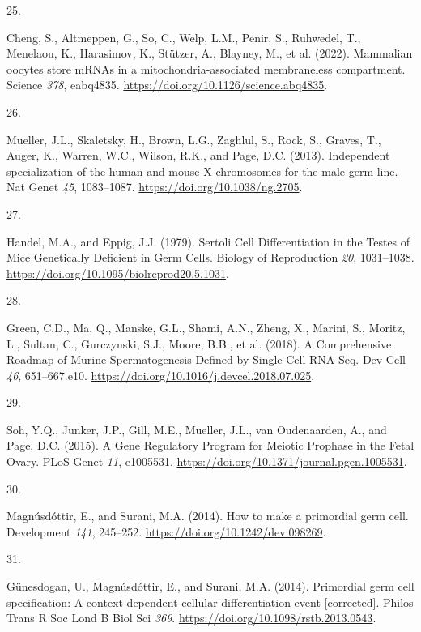 \documentclass[
]{article}
\newlength{\cslhangindent}
\newlength{\csllabelwidth}
\newlength{\cslentryspacingunit} %
\newenvironment{CSLReferences}[2] %
 {%
  \setlength{\parindent}{0pt}
  \ifodd #1
  \let\oldpar\par
  \def\par{\hangindent=\cslhangindent\oldpar}
  \fi
  \setlength{\parskip}{#2\cslentryspacingunit}
 }%
 {}
\newcommand{\CSLLeftMargin}[1]{\parbox[t]{\csllabelwidth}{#1}}
\newcommand{\CSLRightInline}[1]{\parbox[t]{\linewidth - \csllabelwidth}{#1}\break}
\begin{document}
\begin{CSLReferences}{0}{0}
\leavevmode{}%
\CSLLeftMargin{25. }%
\CSLRightInline{Cheng, S., Altmeppen, G., So, C., Welp, L.M., Penir, S.,
Ruhwedel, T., Menelaou, K., Harasimov, K., Stützer, A., Blayney, M., et
al. (2022). Mammalian oocytes store {mRNAs} in a mitochondria-associated
membraneless compartment. Science \emph{378}, eabq4835.
\url{https://doi.org/10.1126/science.abq4835}.}

\leavevmode{}%
\CSLLeftMargin{26. }%
\CSLRightInline{Mueller, J.L., Skaletsky, H., Brown, L.G., Zaghlul, S.,
Rock, S., Graves, T., Auger, K., Warren, W.C., Wilson, R.K., and Page,
D.C. (2013). Independent specialization of the human and mouse {X}
chromosomes for the male germ line. Nat Genet \emph{45}, 1083--1087.
\url{https://doi.org/10.1038/ng.2705}.}

\leavevmode{}%
\CSLLeftMargin{27. }%
\CSLRightInline{Handel, M.A., and Eppig, J.J. (1979). Sertoli {Cell
Differentiation} in the {Testes} of {Mice Genetically Deficient} in
{Germ Cells}. Biology of Reproduction \emph{20}, 1031--1038.
\url{https://doi.org/10.1095/biolreprod20.5.1031}.}

\leavevmode{}%
\CSLLeftMargin{28. }%
\CSLRightInline{Green, C.D., Ma, Q., Manske, G.L., Shami, A.N., Zheng,
X., Marini, S., Moritz, L., Sultan, C., Gurczynski, S.J., Moore, B.B.,
et al. (2018). A {Comprehensive Roadmap} of {Murine Spermatogenesis
Defined} by {Single-Cell RNA-Seq}. Dev Cell \emph{46}, 651--667.e10.
\url{https://doi.org/10.1016/j.devcel.2018.07.025}.}

\leavevmode{}%
\CSLLeftMargin{29. }%
\CSLRightInline{Soh, Y.Q., Junker, J.P., Gill, M.E., Mueller, J.L., van
Oudenaarden, A., and Page, D.C. (2015). A {Gene Regulatory Program} for
{Meiotic Prophase} in the {Fetal Ovary}. PLoS Genet \emph{11}, e1005531.
\url{https://doi.org/10.1371/journal.pgen.1005531}.}

\leavevmode{}%
\CSLLeftMargin{30. }%
\CSLRightInline{Magnúsdóttir, E., and Surani, M.A. (2014). How to make a
primordial germ cell. Development \emph{141}, 245--252.
\url{https://doi.org/10.1242/dev.098269}.}

\leavevmode{}%
\CSLLeftMargin{31. }%
\CSLRightInline{Günesdogan, U., Magnúsdóttir, E., and Surani, M.A.
(2014). Primordial germ cell specification: A context-dependent cellular
differentiation event {[}corrected{]}. Philos Trans R Soc Lond B Biol
Sci \emph{369}. \url{https://doi.org/10.1098/rstb.2013.0543}.}


\end{CSLReferences}
\end{document}
